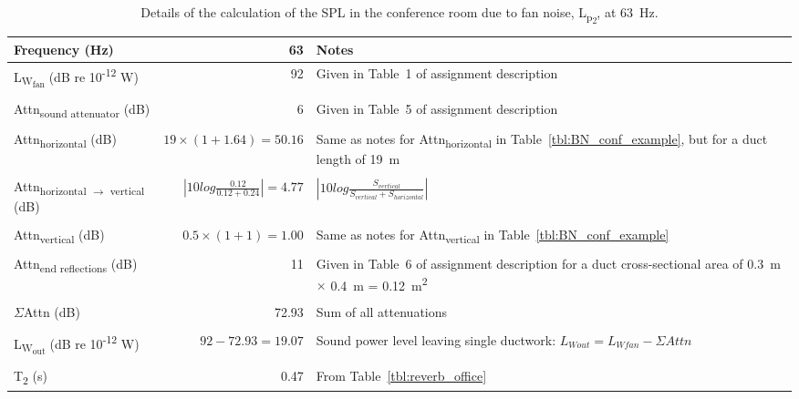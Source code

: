 \begin{sidewaystable}[htbp]
	\caption{Details of the calculation of the SPL in the conference room due to fan noise, L\textsubscript{p\textsubscript{2}}, at 63~Hz.}
	\label{tbl:BN_office_example}
	\centering
	\begin{tabular}{@{}m{5cm}rm{12cm}@{}}
		\toprule
		Frequency (Hz) & 63 & Notes \\ \midrule
		L\textsubscript{W\textsubscript{fan}} (dB re 10\textsuperscript{-12} W) & 92 & Given in Table~1 of assignment description \\
		& \multicolumn{1}{l}{} &  \\
		Attn\textsubscript{sound attenuator} (dB) & 6 & Given in Table~5 of assignment description \\
		& \multicolumn{1}{l}{} &  \\
		Attn\textsubscript{horizontal} (dB) & $19 \times (1 + 1.64) = 50.16$ & Same as notes for Attn\textsubscript{horizontal} in Table~\ref{tbl:BN_conf_example}, but for a duct length of 19~m \\
		& \multicolumn{1}{l}{} &  \\
		Attn\textsubscript{horizontal $\rightarrow$ vertical} (dB) & $\left|10 log \frac{0.12}{0.12 + 0.24}\right| = 4.77$ & $\left|10 log \frac{S_{vertical}}{S_{vertical} + S_{horizontal}}\right|$ \\
		& \multicolumn{1}{l}{} &  \\
		Attn\textsubscript{vertical} (dB) & $0.5 \times (1 + 1) = 1.00$ & Same as notes for Attn\textsubscript{vertical} in Table~\ref{tbl:BN_conf_example} \\
		& \multicolumn{1}{l}{} &  \\
		Attn\textsubscript{end reflections} (dB) & 11 & Given in Table~6 of assignment description for a duct cross-sectional area of 0.3~m $\times$ 0.4~m = 0.12~m\textsuperscript{2} \\
		& \multicolumn{1}{l}{} &  \\
		$\Sigma$Attn (dB) & 72.93 & Sum of all attenuations \\
		& \multicolumn{1}{l}{} &  \\
		L\textsubscript{W\textsubscript{out}} (dB re 10\textsuperscript{-12} W) & $92 - 72.93 = 19.07$ & Sound power level leaving single ductwork: $L_{W out} = L_{W fan} - \Sigma Attn$ \\
		& \multicolumn{1}{l}{} &  \\
		T\textsubscript{2} (s) & 0.47 & From Table~\ref{tbl:reverb_office} \\

\end{tabular}
\end{sidewaystable}
